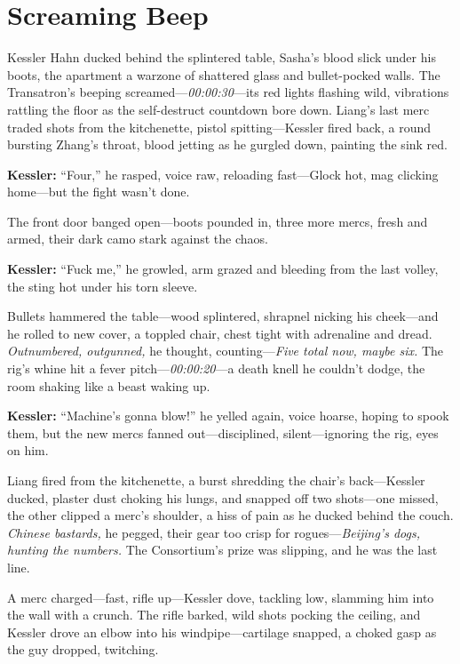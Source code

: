 \documentclass[12pt]{book}
\begin{document}
\section{Screaming Beep}

Kessler Hahn ducked behind the splintered table, Sasha’s blood slick under his boots, the apartment a warzone of shattered glass and bullet-pocked walls. The Transatron’s beeping screamed—\emph{00:00:30}—its red lights flashing wild, vibrations rattling the floor as the self-destruct countdown bore down. Liang’s last merc traded shots from the kitchenette, pistol spitting—Kessler fired back, a round bursting Zhang’s throat, blood jetting as he gurgled down, painting the sink red. 

\vspace{0.5em}
\textbf{Kessler:} “Four,” he rasped, voice raw, reloading fast—Glock hot, mag clicking home—but the fight wasn’t done.

The front door banged open—boots pounded in, three more mercs, fresh and armed, their dark camo stark against the chaos. 

\vspace{0.5em}
\textbf{Kessler:} “Fuck me,” he growled, arm grazed and bleeding from the last volley, the sting hot under his torn sleeve.

Bullets hammered the table—wood splintered, shrapnel nicking his cheek—and he rolled to new cover, a toppled chair, chest tight with adrenaline and dread. \emph{Outnumbered, outgunned,} he thought, counting—\emph{Five total now, maybe six.} The rig’s whine hit a fever pitch—\emph{00:00:20}—a death knell he couldn’t dodge, the room shaking like a beast waking up.

\vspace{0.5em}
\textbf{Kessler:} “Machine’s gonna blow!” he yelled again, voice hoarse, hoping to spook them, but the new mercs fanned out—disciplined, silent—ignoring the rig, eyes on him.

Liang fired from the kitchenette, a burst shredding the chair’s back—Kessler ducked, plaster dust choking his lungs, and snapped off two shots—one missed, the other clipped a merc’s shoulder, a hiss of pain as he ducked behind the couch. \emph{Chinese bastards,} he pegged, their gear too crisp for rogues—\emph{Beijing’s dogs, hunting the numbers.} The Consortium’s prize was slipping, and he was the last line.

A merc charged—fast, rifle up—Kessler dove, tackling low, slamming him into the wall with a crunch. The rifle barked, wild shots pocking the ceiling, and Kessler drove an elbow into his windpipe—cartilage snapped, a choked gasp as the guy dropped, twitching. 
\end{document}
